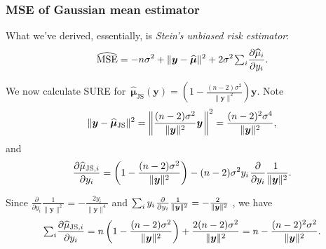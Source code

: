 \documentclass[18pt, handout]{beamer}
\newcommand{\defineTightSpacing}{%
	\setlength{\abovedisplayskip}{.25\baselineskip}%
	\setlength{\belowdisplayskip}{.25\baselineskip}%
}
\renewcommand{\textsc}[1]{{\small \MakeUppercase{#1}}}
\newcommand{\thinnerspace}{\mskip.5\thinmuskip}
\newcommand{\by}{\bm{y}}
\newcommand{\bmu}{\bm{\mu}}
\begin{document}
\begin{frame}
\frametitle{M{\normalsize SE} of Gaussian mean estimator}
What we've derived, essentially, is \textit{Stein's unbiased risk estimator}:
\begin{equation*} \defineTightSpacing%
\widehat{\operatorname{MSE}}
	= - n \sigma^2 +  \| \by - \widehat{\bmu} \|^2 
		+ 2 \sigma^2 \thinnerspace {\textstyle \sum_i} \frac{\partial \widehat{\mu}_i}{\partial y_i}.
\end{equation*}
\vspace*{-.7\baselineskip}

We now calculate \textsc{SURE} for $\, \widehat{\bmu}_{\mathrm{JS}}(\by) = \left( 1 - \frac{(n - 2) \sigma^2}{\| \by \|^2} \right) \! \by$. 
Note
\begin{equation*} \defineTightSpacing%
\| \by - \widehat{\bmu}_{\mathrm{JS}} \|^2 
	= \left\| \frac{(n - 2) \sigma^2}{\| \by \|^2} \by \thinnerspace \right\|^2 
	= \frac{(n - 2)^2 \sigma^4}{\| \by \|^2},
\end{equation*}
and
\begin{equation*} \defineTightSpacing%
\frac{\partial \widehat{\mu}_{\mathrm{JS}, i}}{\partial y_i}
	= \left( 1 - \frac{(n - 2) \sigma^2}{\| \by \|^2} \right) - (n - 2) \sigma^2 y_i \thinnerspace \frac{\partial}{\partial y_i} \frac{\!\!1}{\| \by \|^2}.
\end{equation*}

\smallskip
Since $\frac{\partial}{\partial y_i} \frac{\!\!1}{\| \by \|^2} = - \frac{\!\!2 y_i}{\| \by \|^4}$ and $\sum_i  y_i \thinnerspace \frac{\partial}{\partial y_i} \frac{\!\!1}{\| \by \|^2} = - \frac{\!\!2}{\| \by \|^2}$ , we have
\begin{equation*} \defineTightSpacing%
{\textstyle \sum_i} \frac{\partial \widehat{\mu}_{\mathrm{JS}, i}}{\partial y_i}
	= n \left( 1 - \frac{(n - 2) \sigma^2}{\| \by \|^2} \right) + \frac{2 (n - 2) \sigma^2}{\| \by \|^2} %
	= n - \frac{(n - 2)^2 \sigma^2}{\| \by \|^2}.
\end{equation*}
\end{frame}
\end{document}
